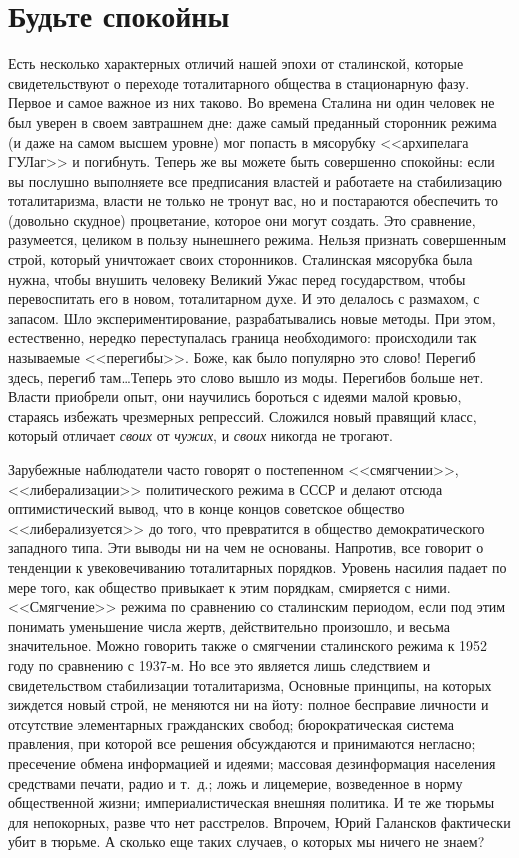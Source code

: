 \documentclass{book}
\begin{document}
\section{Будьте спокойны}

Есть несколько характерных отличий нашей эпохи от сталинской, которые свидетельствуют о переходе тоталитарного общества в стационарную фазу. Первое и самое важное из них таково. Во времена Сталина ни один человек не был уверен в своем завтрашнем дне: 
даже самый преданный сторонник режима (и даже на самом высшем уровне) мог попасть в мя­сорубку <<архипелага ГУЛаг>> и погибнуть. 
Теперь же вы мо­жете быть совершенно спокойны: если вы послушно выполня­ете все предписания властей и работаете на стабилизацию 
тота­литаризма, власти не только не тронут вас, но и постараются обеспечить то (довольно скудное) процветание, которое они могут 
создать. Это сравнение, разумеется, целиком в пользу нынешнего режима. Нельзя признать совершенным строй, который уничтожает 
своих сторонников. Сталинская мясорубка была нужна, чтобы внушить человеку Великий Ужас перед государством, чтобы перевоспитать 
его в новом, тоталитарном духе. И это делалось с размахом, с запасом. Шло экспериментирование, разрабатывались новые методы. При 
этом, естественно, нередко переступалась граница необходимого: происходили так называемые <<перегибы>>. Боже, как было популяр­но это слово! Перегиб здесь, перегиб там\ldots Теперь это слово вышло из моды. Перегибов больше нет. Власти приобрели опыт, они научились бороться с идеями малой кровью, стараясь избежать чрезмерных репрессий. Сложился новый правящий класс, который отличает \textit{своих} от \textit{чужих},  и \textit{своих}  никогда не трогают.

Зарубежные наблюдатели часто говорят о постепенном <<смягчении>>, <<либерализации>> политического режима в СССР и делают отсюда 
оптимистический вывод, что в конце концов советское общество <<либерализуется>> до того, что превратится в общество 
демократического западного типа. Эти выводы ни на чем не основаны. Напротив, все говорит о тенденции к увековечиванию 
тоталитарных порядков. Уровень насилия падает по мере того, как общество привыкает к этим порядкам, смиряется с ними. 
<<Смягчение>> режима по сравнению со сталинским периодом, если под этим понимать уменьшение числа жертв, действительно 
произошло, и весьма значительное. Можно говорить также о смягчении сталинского режима к 1952 году по сравнению с 1937-м. Но все 
это является лишь следствием и свидетельством стабилизации тоталитаризма, Основные принципы, на которых зиждется новый строй, не 
меняются ни на йоту: полное бесправие личности и отсутствие элементарных гражданских свобод; бюрократическая систе­ма правления, 
при которой все решения обсуждаются и при­нимаются негласно; пресечение обмена информацией и идея­ми; массовая дезинформация населения средствами печати, радио и т.~д.; ложь и лицемерие, возведенное в норму общест­венной жизни; империалистическая внешняя политика. И те же тюрьмы для непокорных, разве что нет расстрелов. Впрочем, Юрий Галансков фактически убит в тюрьме. А сколько еще таких случаев, о которых мы ничего не знаем?
\end{document}
